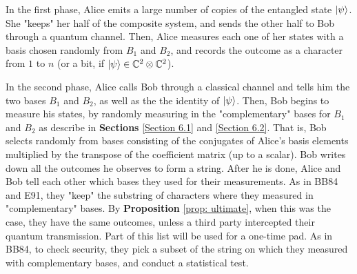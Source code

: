 In the first phase, Alice emits a large number of copies of the entangled state $\ket{\psi}$.  She "keeps" her half of the composite system, and sends the other half to Bob through a quantum channel.  Then, Alice measures each one of her states with a basis chosen randomly from $B_1$ and $B_2$, and records the outcome as a character from $1$ to $n$ (or a bit, if $\ket{\psi}\in {\mathbb{C}}^2 \otimes {\mathbb{C}}^2$).  



In the second phase, Alice calls Bob through a classical channel and tells him the two bases $B_1$ and $B_2$, as well as the the identity of $\ket{\psi}$.  Then, Bob begins to measure his states, by randomly measuring in the "complementary" bases for $B_1$ and $B_2$ as describe in {\bf{Sections}} \ref{Section 6.1} and \ref{Section 6.2}.  That is, Bob selects randomly from bases consisting of the conjugates of Alice's basis elements multiplied by the transpose of the coefficient matrix (up to a scalar).  Bob writes down all the outcomes he observes to form a string.  After he is done, Alice and Bob tell each other which bases they used for their measurements.  As in BB84 and E91, they "keep" the substring of characters where they measured in "complementary" bases.  By {\bf{Proposition}} \ref{prop: ultimate}, when this was the case, they have the same outcomes, unless a third party intercepted their quantum transmission.  Part of this list will be used for a one-time pad.  As in BB84, to check security, they pick a subset of the string on which they measured with complementary bases, and conduct a statistical test.


